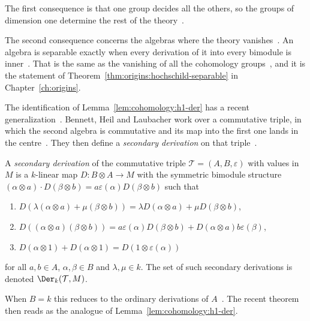 The first consequence is that one group decides all the others, so the groups
of dimension one determine the rest of the
theory~\cite[Theorem~3.1, p.~60]{Hochschild1945}.

The second consequence concerns the algebras where the theory
vanishes~\cite[p.~58 and \S~4]{Hochschild1945}. An algebra is separable exactly
when every derivation of it into every bimodule is
inner~\cite[p.~58 and \S~4]{Hochschild1945}. That is the same as the vanishing
of all the cohomology groups~\cite[p.~58 and \S~4]{Hochschild1945}, and it is
the statement of
Theorem~\ref{thm:origins:hochschild-separable} in Chapter~\ref{ch:origins}.

The identification of Lemma~\ref{lem:cohomology:h1-der} has a recent
generalization~\cite[Definition~2.1, p.~1]{BennettHeilLaubacher2023}. Bennett,
Heil and Laubacher work over a commutative triple, in which the second algebra
is commutative and its map into the first one lands in the
centre~\cite[Definition~2.1, p.~1]{BennettHeilLaubacher2023}. They then define
a \emph{secondary derivation} on that
triple~\cite[Definition~3.1, p.~5]{BennettHeilLaubacher2023}.

\begin{definition}\label{def:cohomology:secondary}
A \emph{secondary derivation} of the commutative triple
$\mathcal{T} = (A, B, \varepsilon)$ with values in $M$ is a $k$-linear map
$D\colon B\otimes A \to M$ with the symmetric bimodule structure
$(\alpha\otimes a)\cdot D(\beta\otimes b) = a\varepsilon(\alpha)D(\beta\otimes b)$
such that
\begin{enumerate}
\item $D(\lambda(\alpha\otimes a) + \mu(\beta\otimes b)) = \lambda D(\alpha\otimes a) + \mu D(\beta\otimes b)$,
\item $D((\alpha\otimes a)(\beta\otimes b)) = a\varepsilon(\alpha)D(\beta\otimes b) + D(\alpha\otimes a)b\varepsilon(\beta)$,
\item $D(\alpha\otimes 1) + D(\alpha\otimes 1) = D(1\otimes\varepsilon(\alpha))$
\end{enumerate}
for all $a, b\in A$, $\alpha, \beta\in B$ and $\lambda, \mu\in k$. The set of
such secondary derivations is denoted $\Der_k(\mathcal{T}, M)$.
\end{definition}

When $B = k$ this reduces to the ordinary derivations of
$A$~\cite[Remark~3.3, p.~5]{BennettHeilLaubacher2023}. The recent theorem then
reads as the analogue of Lemma~\ref{lem:cohomology:h1-der}.

